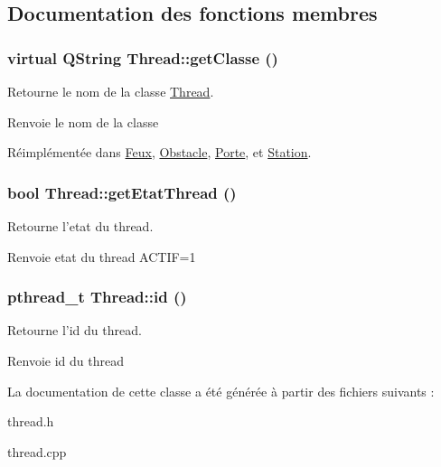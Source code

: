 \subsection{Documentation des fonctions membres}
\hypertarget{classThread_ad055e7c603fda2607670f69c32b2d98a}{
\subsubsection[{getClasse}]{\setlength{\rightskip}{0pt plus 5cm}virtual QString Thread::getClasse ()}}
\label{classThread_ad055e7c603fda2607670f69c32b2d98a}


Retourne le nom de la classe \hyperlink{classThread}{Thread}. 

\begin{DoxyReturn}{Renvoie}
le nom de la classe 
\end{DoxyReturn}


Réimplémentée dans \hyperlink{classFeux_ac06b420ea2bb015007eb03ca2401176e}{Feux}, \hyperlink{classObstacle_a7773466eaafb92cef0ec22f5cc79522c}{Obstacle}, \hyperlink{classPorte_a773001136f190566b51b4e24c4323409}{Porte}, et \hyperlink{classStation_aea030824145267b81a453f5b56227cae}{Station}.

\hypertarget{classThread_a06a3cea9c644b36becc3dc21444d9f99}{
\subsubsection[{getEtatThread}]{\setlength{\rightskip}{0pt plus 5cm}bool Thread::getEtatThread ()}}
\label{classThread_a06a3cea9c644b36becc3dc21444d9f99}


Retourne l'etat du thread. 

\begin{DoxyReturn}{Renvoie}
etat du thread ACTIF=1 
\end{DoxyReturn}
\hypertarget{classThread_a2bcb649ad0f9304744c18e5c15d7fa8e}{
\subsubsection[{id}]{\setlength{\rightskip}{0pt plus 5cm}pthread\_\-t Thread::id ()}}
\label{classThread_a2bcb649ad0f9304744c18e5c15d7fa8e}


Retourne l'id du thread. 

\begin{DoxyReturn}{Renvoie}
id du thread 
\end{DoxyReturn}


La documentation de cette classe a été générée à partir des fichiers suivants :\begin{DoxyCompactItemize}
\item 
thread.h\item 
thread.cpp\end{DoxyCompactItemize}
